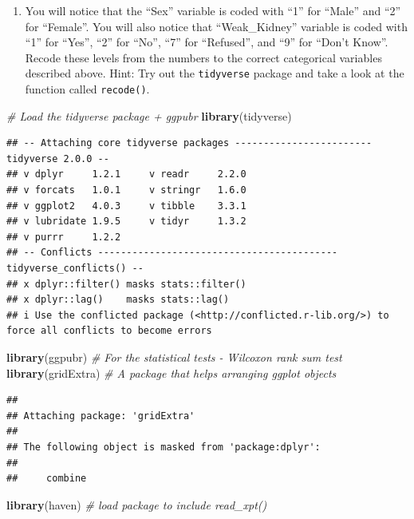 \documentclass[
]{article}
\newenvironment{Shaded}{\begin{snugshade}}{\end{snugshade}}
\newcommand{\CommentTok}[1]{\textcolor[rgb]{0.56,0.35,0.01}{\textit{#1}}}
\newcommand{\FunctionTok}[1]{\textcolor[rgb]{0.13,0.29,0.53}{\textbf{#1}}}
\newcommand{\NormalTok}[1]{#1}
\providecommand{\tightlist}{%
  \setlength{\itemsep}{0pt}\setlength{\parskip}{0pt}}
\begin{document}
\begin{enumerate}
\def\labelenumi{\alph{enumi})}
\setcounter{enumi}{2}
\tightlist
\item
  You will notice that the ``Sex'' variable is coded with ``1'' for
  ``Male'' and ``2'' for ``Female''. You will also notice that
  ``Weak\_Kidney'' variable is coded with ``1'' for ``Yes'', ``2'' for
  ``No'', ``7'' for ``Refused'', and ``9'' for ``Don't Know''. Recode
  these levels from the numbers to the correct categorical variables
  described above. Hint: Try out the \texttt{tidyverse} package and take
  a look at the function called \texttt{recode()}.
\end{enumerate}

\begin{Shaded}
\begin{Highlighting}[]
\CommentTok{\# Load the tidyverse package + ggpubr}
\FunctionTok{library}\NormalTok{(tidyverse)}
\end{Highlighting}
\end{Shaded}

\begin{verbatim}
## -- Attaching core tidyverse packages ------------------------ tidyverse 2.0.0 --
## v dplyr     1.2.1     v readr     2.2.0
## v forcats   1.0.1     v stringr   1.6.0
## v ggplot2   4.0.3     v tibble    3.3.1
## v lubridate 1.9.5     v tidyr     1.3.2
## v purrr     1.2.2     
## -- Conflicts ------------------------------------------ tidyverse_conflicts() --
## x dplyr::filter() masks stats::filter()
## x dplyr::lag()    masks stats::lag()
## i Use the conflicted package (<http://conflicted.r-lib.org/>) to force all conflicts to become errors
\end{verbatim}

\begin{Shaded}
\begin{Highlighting}[]
\FunctionTok{library}\NormalTok{(ggpubr) }\CommentTok{\# For the statistical tests {-} Wilcoxon rank sum test}
\FunctionTok{library}\NormalTok{(gridExtra) }\CommentTok{\# A package that helps arranging ggplot objects}
\end{Highlighting}
\end{Shaded}

\begin{verbatim}
## 
## Attaching package: 'gridExtra'
## 
## The following object is masked from 'package:dplyr':
## 
##     combine
\end{verbatim}

\begin{Shaded}
\begin{Highlighting}[]
\FunctionTok{library}\NormalTok{(haven) }\CommentTok{\# load package to include read\_xpt()}
\end{Highlighting}
\end{Shaded}
\end{document}
